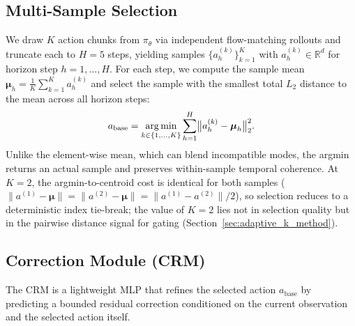 \subsection{Multi-Sample Selection}
\label{sec:selection}

We draw $K$ action chunks from $\pi_\theta$ via independent flow-matching rollouts and truncate each to $H{=}5$ steps, yielding samples $\{a_h^{(k)}\}_{k=1}^K$ with $a_h^{(k)} \in \mathbb{R}^d$ for horizon step $h = 1, \dots, H$. For each step, we compute the sample mean $\boldsymbol{\mu}_h = \frac{1}{K}\sum_{k=1}^K a_h^{(k)}$ and select the sample with the smallest total $L_2$ distance to the mean across all horizon steps:
\begin{equation}
  a_{\mathrm{base}} = \operatorname*{arg\,min}_{k \in \{1,\dots,K\}} \sum_{h=1}^{H} \bigl\|a_h^{(k)} - \boldsymbol{\mu}_h\bigr\|_2^2.
  \label{eq:argmin}
\end{equation}
Unlike the element-wise mean, which can blend incompatible modes, the argmin returns an actual sample and preserves within-sample temporal coherence. At $K{=}2$, the argmin-to-centroid cost is identical for both samples ($\|a^{(1)} - \boldsymbol{\mu}\| = \|a^{(2)} - \boldsymbol{\mu}\| = \|a^{(1)} - a^{(2)}\|/2$), so selection reduces to a deterministic index tie-break; the value of $K{=}2$ lies not in selection quality but in the pairwise distance signal for gating (Section~\ref{sec:adaptive_k_method}).

\subsection{Correction Module (CRM)}
\label{sec:crm}

The CRM is a lightweight MLP that refines the selected action $a_{\mathrm{base}}$ by predicting a bounded residual correction conditioned on the current observation and the selected action itself.

